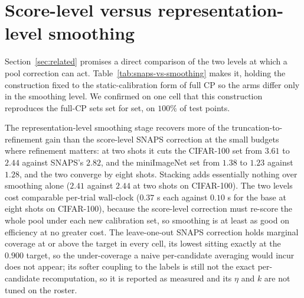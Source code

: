
\section{Score-level versus representation-level smoothing}
\label{app:snaps}

Section~\ref{sec:related} promises a direct comparison of the two levels at
which a pool correction can act. Table~\ref{tab:snaps-vs-smoothing} makes it,
holding the construction fixed to the static-calibration form of full CP so
the arms differ only in the smoothing level. We confirmed on one cell that
this construction reproduces the full-CP sets set for set, on $100\%$ of test
points.



The representation-level smoothing
stage recovers more of the truncation-to-refinement gain than the score-level
SNAPS correction at the small budgets where refinement matters: at two shots
it cuts the CIFAR-100 set from $3.61$ to $2.44$ against SNAPS's $2.82$, and the
miniImageNet set from $1.38$ to $1.23$ against $1.28$, and the two converge by
eight shots. Stacking adds essentially nothing over smoothing alone ($2.41$
against $2.44$ at two shots on CIFAR-100). The two levels cost comparable
per-trial wall-clock ($0.37$ s each against $0.10$ s for the base at eight
shots on CIFAR-100), because the score-level correction must re-score the
whole pool under each new calibration set, so smoothing is at least as good on
efficiency at no greater cost. The leave-one-out SNAPS correction holds marginal coverage at or
above the target in every cell, its lowest sitting exactly at the $0.900$
target, so the under-coverage a naive per-candidate averaging would incur
does not appear;
its softer coupling to the labels is still not the exact per-candidate
recomputation, so it is reported as measured and its $\eta$ and $k$ are not
tuned on the roster.

